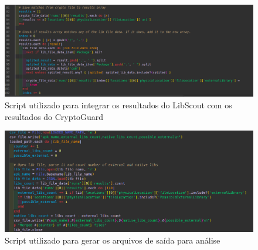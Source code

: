 \FloatBarrier

\begin{figure}[!ht]
  \centering
  \includegraphics[scale=0.4]{img/integration_script_crypto.png}
  \caption{Script utilizado para integrar os resultados do LibScout com os resultados do CryptoGuard}
  \label{img: integration_script_crypto}
\end{figure}

\FloatBarrier


\begin{figure}[!ht]
  \centering
  \includegraphics[scale=0.5]{img/output_script_counter.png}
  \caption{Script utilizado para gerar os arquivos de saída para análise}
  \label{img: output_script}
\end{figure}

\FloatBarrier